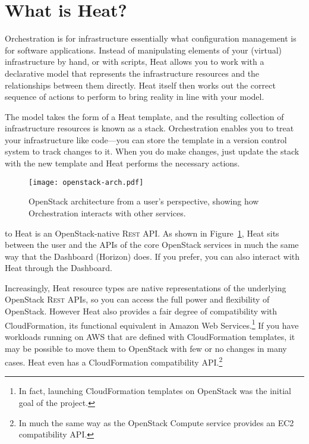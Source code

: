 \section{What is Heat?}

Orchestration is for infrastructure essentially what configuration management is for software applications. Instead of manipulating elements of your (virtual) infrastructure by hand, or with scripts, Heat allows you to work with a declarative model that represents the infrastructure resources and the relationships between them directly. Heat itself then works out the correct sequence of actions to perform to bring reality in line with your model.

The model takes the form of a Heat template, and the resulting collection of infrastructure resources is known as a stack. Orchestration enables you to treat your infrastructure like code---you can store the template in a version control system to track changes to it. When you do make changes, just update the stack with the new template and Heat performs the necessary actions.

\begin{figure}[b]
\centering
\texttt{[image: openstack-arch.pdf]}
\caption{OpenStack architecture from a user's perspective, showing how Orchestration interacts with other services.}
\label{fig:openstack-arch}
\end{figure}

 to Heat is an OpenStack-native \textsc{Rest} API. As shown in Figure~\ref{fig:openstack-arch}, Heat sits between the user and the APIs of the core OpenStack services in much the same way that the Dashboard (Horizon) does. If you prefer, you can also interact with Heat through the Dashboard.

Increasingly, Heat resource types are native representations of the underlying OpenStack \textsc{Rest} APIs, so you can access the full power and flexibility of OpenStack. However Heat also provides a fair degree of compatibility with CloudFormation, its functional equivalent in Amazon Web Services.\footnote{In fact, launching CloudFormation templates on OpenStack was the initial goal of the project.} If you have workloads running on AWS that are defined with CloudFormation templates, it may be possible to move them to OpenStack with few or no changes in many cases. Heat even has a CloudFormation compatibility API.\footnote{In much the same way as the OpenStack Compute service provides an EC2 compatibility API.}
